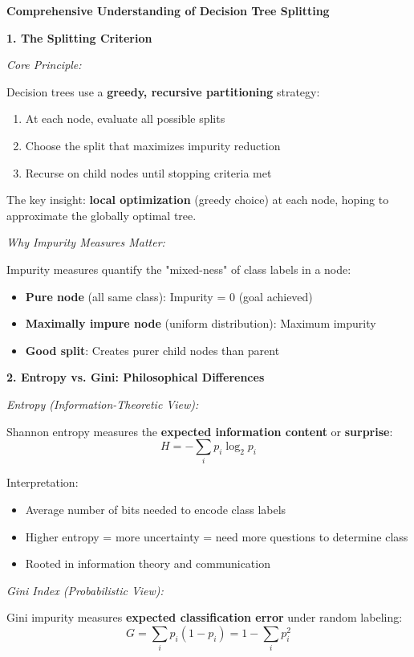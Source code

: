 \documentclass[12pt]{article}
\begin{document}
\begin{explanation}
\textbf{Comprehensive Understanding of Decision Tree Splitting}

\textbf{1. The Splitting Criterion}

\textit{Core Principle:}

Decision trees use a \textbf{greedy, recursive partitioning} strategy:
\begin{enumerate}
    \item At each node, evaluate all possible splits
    \item Choose the split that maximizes impurity reduction
    \item Recurse on child nodes until stopping criteria met
\end{enumerate}

The key insight: \textbf{local optimization} (greedy choice) at each node, hoping to approximate the globally optimal tree.

\textit{Why Impurity Measures Matter:}

Impurity measures quantify the "mixed-ness" of class labels in a node:
\begin{itemize}
    \item \textbf{Pure node} (all same class): Impurity = 0 (goal achieved)
    \item \textbf{Maximally impure node} (uniform distribution): Maximum impurity
    \item \textbf{Good split}: Creates purer child nodes than parent
\end{itemize}

\textbf{2. Entropy vs. Gini: Philosophical Differences}

\textit{Entropy (Information-Theoretic View):}

Shannon entropy measures the \textbf{expected information content} or \textbf{surprise}:
\[
H = -\sum_i p_i \log_2 p_i
\]

Interpretation:
\begin{itemize}
    \item Average number of bits needed to encode class labels
    \item Higher entropy = more uncertainty = need more questions to determine class
    \item Rooted in information theory and communication
\end{itemize}

\textit{Gini Index (Probabilistic View):}

Gini impurity measures \textbf{expected classification error} under random labeling:
\[
G = \sum_i p_i(1 - p_i) = 1 - \sum_i p_i^2
\]


\end{explanation}
\end{document}
